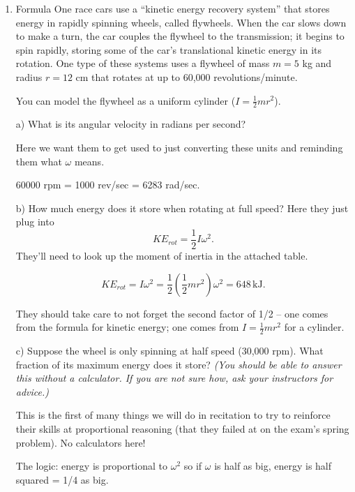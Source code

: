 \documentclass[12pt]{article}
\begin{document}
\Large
\centerline{}
\normalsize
\centerline{}


\begin{enumerate}

\item {Formula One race cars use a ``kinetic energy recovery system'' that stores energy in rapidly spinning wheels, called flywheels. When the car slows down to make a turn, the car couples the flywheel to the transmission; it begins to spin rapidly, storing some of the car's translational kinetic energy in its rotation. One type of these systems uses a flywheel of mass $m=5$ kg and radius $r=12$ cm that rotates at up to 60,000 revolutions/minute.

You can model the flywheel as a uniform cylinder ($I=\frac{1}{2}mr^2$).


a) What is its angular velocity in radians per second?

{\color{red} Here we want them to get used to just converting these units and reminding them what $\omega$ means.}

{\color{blue} 60000 rpm = 1000 rev/sec = 6283 rad/sec.}

b) How much energy does it store when rotating at full speed?
{\color{red} Here they just plug into $$KE_{rot} = \frac{1}{2}I \omega^2.$$ They'll need to look up the moment of inertia in the attached table.}

{\color{blue}$$KE_{rot} = I \omega^2 = \frac{1}{2} \left(\frac{1}{2}mr^2\right) \omega^2 = 648\,\text{kJ}.$$ 

They should take care to not forget the second factor of 1/2 -- one comes from the formula for kinetic energy; one comes from $I=\frac{1}{2}mr^2$ for a cylinder. }


c) Suppose the wheel is only spinning at half speed (30,000 rpm). What fraction of its maximum energy does it store? \textit{(You should be able to answer this without a calculator. If you are not sure how, ask your instructors for advice.)}

{\color{red}  This is the first of many things we will do in recitation to try to reinforce their skills at proportional reasoning (that they failed at on the exam's spring problem). No calculators here!}

{\color{blue} The logic: energy is proportional to $\omega^2$ so if $\omega$ is half as big, energy is half squared = 1/4 as big.}



}
\end{enumerate}
\end{document}

